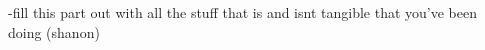 \color{red}
 -fill this part out with all the stuff that is and isnt tangible that you’ve been doing (shanon)
\color{black}